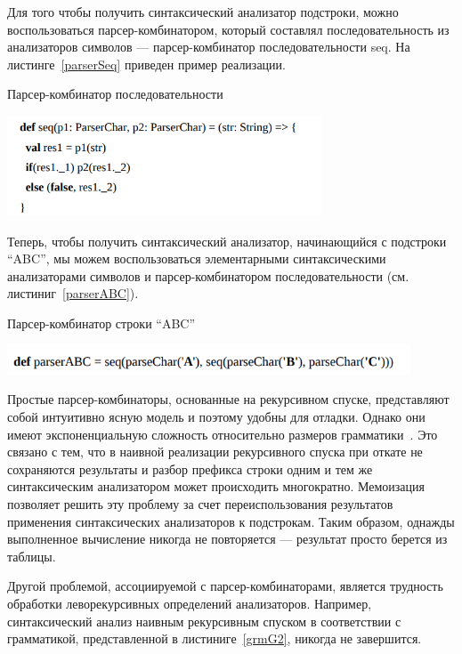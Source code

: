 Для того чтобы получить синтаксический анализатор подстроки, можно воспользоваться парсер-комбинатором,
который составлял последовательность из анализаторов символов --- парсер-комбинатор последовательности seq. На листинге~\ref{parserSeq} приведен пример реализации.

\begin{listing}
\caption{Парсер-комбинатор последовательности}
\label{parserSeq}
\centering
\includegraphics[width=0.7\textwidth]{Smolina/pics/parserSeq.png}
\end{listing}

Теперь, чтобы получить синтаксический анализатор, начинающийся с подстроки ``ABC'', мы можем воспользоваться элементарными синтаксическими анализаторами символов и парсер-комбинатором последовательности (см. листиниг~\ref{parserABC}).

\begin{listing}
\caption{Парсер-комбинатор строки “ABC”}
\label{parserABC}
\centering
\includegraphics[width=0.9\textwidth]{Smolina/pics/parserABC.png}
\end{listing}

Простые парсер-комбинаторы, основанные на рекурсивном спуске, представляют собой интуитивно ясную модель и поэтому удобны для
отладки. Однако они имеют экспоненциальную сложность относительно размеров грамматики~\cite{Popov}. Это связано с тем, что в наивной реализации рекурсивного спуска при откате не сохраняются результаты и разбор префикса строки одним и тем же синтаксическим анализатором может происходить многократно. Мемоизация~\cite{Memoization} позволяет решить эту проблему за счет переиспользования результатов применения синтаксических анализаторов к подстрокам. Таким образом, однажды выполненное вычисление никогда не повторяется --- результат просто берется из таблицы.

Другой проблемой, ассоциируемой с парсер-комбинаторами, является трудность обработки леворекурсивных определений анализаторов. Например, синтаксический анализ наивным рекурсивным спуском в соответствии с грамматикой, представленной в листиниге~\ref{grmG2}, никогда не завершится.

